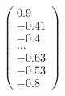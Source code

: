 \documentclass[preview]{standalone}
\begin{document}
\begin{align*}
\begin{pmatrix} 0.9 \\ -0.41 \\ -0.4 \\ \dots \\ -0.63 \\ -0.53 \\ -0.8 \end{pmatrix}
\end{align*}
\end{document}
